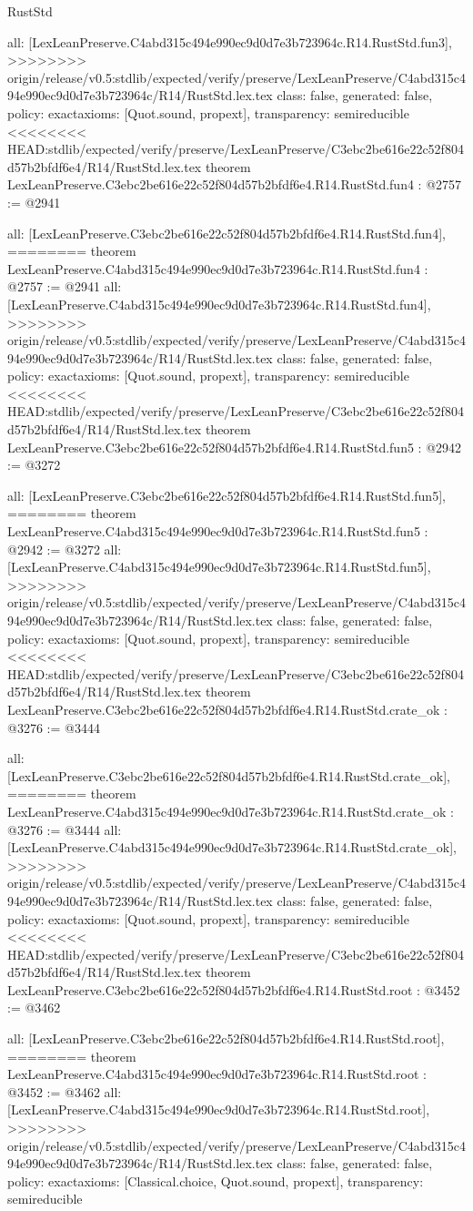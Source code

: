 \begin{lexlean}{RustStd}
\begin{coremodule}
{\begin{coremodule}
{{{{{{{  all: [LexLeanPreserve.C4abd315c494e990ec9d0d7e3b723964c.R14.RustStd.fun3],
>>>>>>>> origin/release/v0.5:stdlib/expected/verify/preserve/LexLeanPreserve/C4abd315c494e990ec9d0d7e3b723964c/R14/RustStd.lex.tex
  class: false,
  generated: false,
  policy: exact{axioms: [Quot.sound, propext]},
  transparency: semireducible
}
<<<<<<<< HEAD:stdlib/expected/verify/preserve/LexLeanPreserve/C3ebc2be616e22c52f804d57b2bfdf6e4/R14/RustStd.lex.tex
theorem LexLeanPreserve.C3ebc2be616e22c52f804d57b2bfdf6e4.R14.RustStd.fun4 : @2757 := @2941 {
  all: [LexLeanPreserve.C3ebc2be616e22c52f804d57b2bfdf6e4.R14.RustStd.fun4],
========
theorem LexLeanPreserve.C4abd315c494e990ec9d0d7e3b723964c.R14.RustStd.fun4 : @2757 := @2941 {
  all: [LexLeanPreserve.C4abd315c494e990ec9d0d7e3b723964c.R14.RustStd.fun4],
>>>>>>>> origin/release/v0.5:stdlib/expected/verify/preserve/LexLeanPreserve/C4abd315c494e990ec9d0d7e3b723964c/R14/RustStd.lex.tex
  class: false,
  generated: false,
  policy: exact{axioms: [Quot.sound, propext]},
  transparency: semireducible
}
<<<<<<<< HEAD:stdlib/expected/verify/preserve/LexLeanPreserve/C3ebc2be616e22c52f804d57b2bfdf6e4/R14/RustStd.lex.tex
theorem LexLeanPreserve.C3ebc2be616e22c52f804d57b2bfdf6e4.R14.RustStd.fun5 : @2942 := @3272 {
  all: [LexLeanPreserve.C3ebc2be616e22c52f804d57b2bfdf6e4.R14.RustStd.fun5],
========
theorem LexLeanPreserve.C4abd315c494e990ec9d0d7e3b723964c.R14.RustStd.fun5 : @2942 := @3272 {
  all: [LexLeanPreserve.C4abd315c494e990ec9d0d7e3b723964c.R14.RustStd.fun5],
>>>>>>>> origin/release/v0.5:stdlib/expected/verify/preserve/LexLeanPreserve/C4abd315c494e990ec9d0d7e3b723964c/R14/RustStd.lex.tex
  class: false,
  generated: false,
  policy: exact{axioms: [Quot.sound, propext]},
  transparency: semireducible
}
<<<<<<<< HEAD:stdlib/expected/verify/preserve/LexLeanPreserve/C3ebc2be616e22c52f804d57b2bfdf6e4/R14/RustStd.lex.tex
theorem LexLeanPreserve.C3ebc2be616e22c52f804d57b2bfdf6e4.R14.RustStd.crate_ok : @3276 := @3444 {
  all: [LexLeanPreserve.C3ebc2be616e22c52f804d57b2bfdf6e4.R14.RustStd.crate_ok],
========
theorem LexLeanPreserve.C4abd315c494e990ec9d0d7e3b723964c.R14.RustStd.crate_ok : @3276 := @3444 {
  all: [LexLeanPreserve.C4abd315c494e990ec9d0d7e3b723964c.R14.RustStd.crate_ok],
>>>>>>>> origin/release/v0.5:stdlib/expected/verify/preserve/LexLeanPreserve/C4abd315c494e990ec9d0d7e3b723964c/R14/RustStd.lex.tex
  class: false,
  generated: false,
  policy: exact{axioms: [Quot.sound, propext]},
  transparency: semireducible
}
<<<<<<<< HEAD:stdlib/expected/verify/preserve/LexLeanPreserve/C3ebc2be616e22c52f804d57b2bfdf6e4/R14/RustStd.lex.tex
theorem LexLeanPreserve.C3ebc2be616e22c52f804d57b2bfdf6e4.R14.RustStd.root : @3452 := @3462 {
  all: [LexLeanPreserve.C3ebc2be616e22c52f804d57b2bfdf6e4.R14.RustStd.root],
========
theorem LexLeanPreserve.C4abd315c494e990ec9d0d7e3b723964c.R14.RustStd.root : @3452 := @3462 {
  all: [LexLeanPreserve.C4abd315c494e990ec9d0d7e3b723964c.R14.RustStd.root],
>>>>>>>> origin/release/v0.5:stdlib/expected/verify/preserve/LexLeanPreserve/C4abd315c494e990ec9d0d7e3b723964c/R14/RustStd.lex.tex
  class: false,
  generated: false,
  policy: exact{axioms: [Classical.choice, Quot.sound, propext]},
  transparency: semireducible
}

}}}}}}}}}}
\end{coremodule}}
\end{coremodule}
\end{lexlean}
